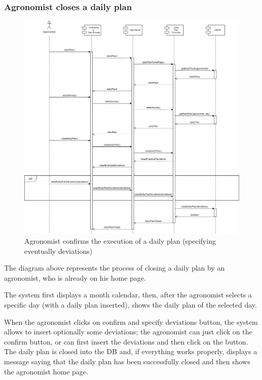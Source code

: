 \documentclass{article}
\begin{document}
        
    \newpage
    
    
    \subsubsection{Agronomist closes a daily plan}
        \begin{figure} [h]
            \centering
            \includegraphics[width=1\textwidth]{images/ArchitecturalDesign/RuntimeView/11. AgronomistConfirmOrDeviationsOnDailyPlan.jpg}
            \caption{\label{fig:agronomistClosesDailyPlan}Agronomist confirms the execution of a daily plan (specifying eventually deviations)}
        \end{figure}
        
        The diagram above represents the process of closing a daily plan by an agronomist, who is already on his home page. \par
        The system first displays a month calendar, then, after the agronomist selects a specific day (with a daily plan inserted), shows the daily plan of the selected day. \par    
        When the agronomist clicks on confirm and specify deviations button, the system allows to insert optionally some deviations; the agronomist can just click on the confirm button, or can first insert the deviations and then click on the button.
        The daily plan is closed into the DB and, if everything works properly, displays a message saying that the daily plan has been successfully closed and then shows the agronomist home page. \par
    
\end{document}
